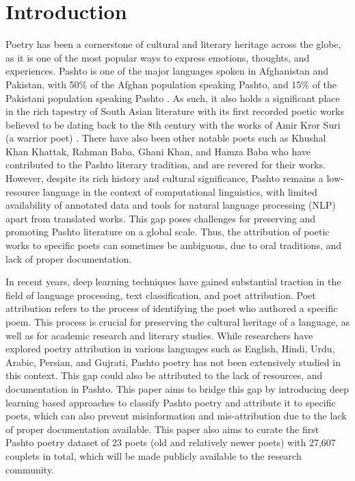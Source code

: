 \section{Introduction}

Poetry has been a cornerstone of cultural and literary heritage across the globe, as it is one of the most popular ways to express emotions, thoughts, and experiences. Pashto is one of the major languages spoken in Afghanistan and Pakistan, with 50\% of the Afghan population speaking Pashto, and 15\% of the Pakistani population speaking Pashto \cite{ciawordlfactbook} \cite{pbs}. As such, it also holds a significant place in the rich tapestry of South Asian literature with its first recorded poetic works believed to be dating back to the 8th century with the works of Amir Kror Suri (a warrior poet) \cite{history_pashto}. There have also been other notable poets such as Khushal Khan Khattak, Rahman Baba, Ghani Khan, and Hamza Baba who have contributed to the Pashto literary tradition, and are revered for their works. However, despite its rich history and cultural significance, Pashto remains a low-resource language in the context of computational linguistics, with limited availability of annotated data and tools for natural language processing (NLP) apart from translated works. This gap poses challenges for preserving and promoting Pashto literature on a global scale. Thus, the attribution of poetic works to specific poets can sometimes be ambiguous, due to oral traditions, and lack of proper documentation. 

In recent years, deep learning techniques have gained substantial traction in the field of language processing, text classification, and poet attribution. Poet attribution refers to the process of identifying the poet who authored a specific poem. This process is crucial for preserving the cultural heritage of a language, as well as for academic research and literary studies. While researchers have explored poetry attribution in various languages such as English, Hindi, Urdu, Arabic, Persian, and Gujrati, Pashto poetry has not been extensively studied in this context. This gap could also be attributed to the lack of resources, and documentation in Pashto. This paper aims to bridge this gap by introducing deep learning based approaches to classify Pashto poetry and attribute it to specific poets, which can also prevent misinformation and mis-attribution due to the lack of proper documentation available. This paper also aims to curate the first Pashto poetry dataset of 23 poets (old and relatively newer poets) with 27,607 couplets in total, which will be made publicly available to the research community.